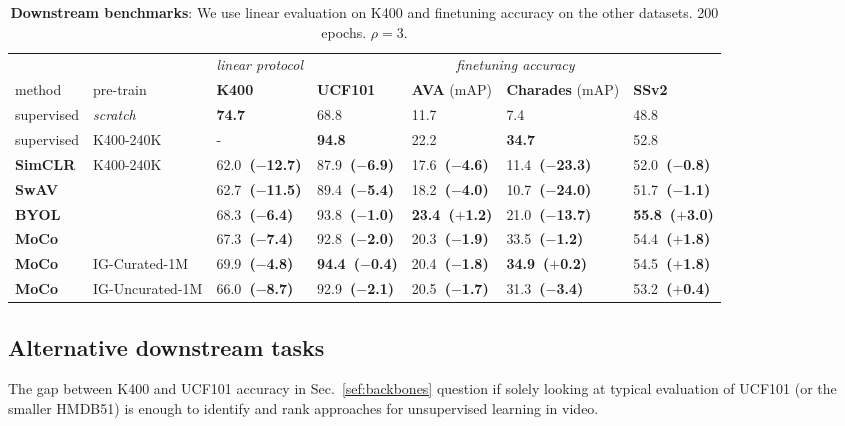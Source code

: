 \documentclass[final]{cvpr}
\newcommand{\sref}[1]{Sec.~\ref{#1}}
\newcommand{\tablestyle}[2]{\setlength{\tabcolsep}{#1}\renewcommand{\arraystretch}{#2}\centering\footnotesize}
\begin{document}
	\newcommand{\pacc}[1]{{\bf \fontsize{7.5}{42}\selectfont \color{citecolor!80}~(#1)}}
	\newcommand{\macc}[1]{{\bf \fontsize{7.5}{42}\selectfont \color{lightred!70}~(#1)}}
	\begin{table}[t] 
		\vspace{-18pt}
		\centering
		\tablestyle{8pt}{1.05} 
		\begin{tabular}{ll|l|llll}
			&&\textit{linear protocol}&\multicolumn{4}{c}{\textit{finetuning accuracy}} \\
			method & pre-train &\textbf{K400} & \textbf{UCF101} & \textbf{AVA} (mAP) & \textbf{Charades} (mAP) & \textbf{SSv2} \\
			\shline
			supervised & \textit{scratch} & \textbf{74.7} & 68.8 & 11.7  & 7.4  & 48.8 \\
			supervised &  K400-240K & - & \textbf{94.8} & 22.2  & \textbf{34.7}  & 52.8 \\ \hline
			\textbf{SimCLR}&  \multirow{4}{*}{K400-240K} & 62.0\macc{$-$12.7}  & 87.9\macc{$-$6.9}  & 17.6\macc{$-$4.6}  & 11.4\macc{$-$23.3}   &  52.0\macc{$-$0.8}       \\ 
			\textbf{SwAV} & & 62.7\macc{$-$11.5}  & 89.4\macc{$-$5.4}  & 18.2\macc{$-$4.0}  & 10.7\macc{$-$24.0}   &  51.7\macc{$-$1.1}       \\ 
			\textbf{BYOL}  && 68.3\macc{$-$6.4}  & 93.8\macc{$-$1.0}  & \textbf{23.4}\pacc{$+$1.2}  & 21.0\macc{$-$13.7}   &  \textbf{55.8}\pacc{$+$3.0}       \\ 
			\textbf{MoCo} & & 67.3\macc{$-$7.4}  & 92.8\macc{$-$2.0}  & 20.3\macc{$-$1.9}  & 33.5\macc{$-$1.2}   &  54.4\pacc{$+$1.8}       \\ \hline
			\textbf{MoCo} & IG-Curated-1M & 69.9\macc{$-$4.8} & \textbf{94.4}\macc{$-$0.4} &  20.4\macc{$-$1.8} &\textbf{34.9}\pacc{$+$0.2} & 54.5\pacc{$+$1.8} \\
			\textbf{MoCo} & IG-Uncurated-1M & 66.0\macc{$-$8.7} & 92.9\macc{$-$2.1} &  20.5\macc{$-$1.7} & 31.3\macc{$-$3.4} & 53.2\pacc{$+$0.4} 
		\end{tabular}
		\caption{\textbf{Downstream benchmarks}: We use linear evaluation on K400 and finetuning accuracy on the other datasets. 200 epochs.  $\rho{=}$3.}
		\label{tab:downstream}
	\end{table}
	\subsection{Alternative downstream tasks}
	The gap between K400 and UCF101 accuracy  in \sref{sef:backbones} question if solely looking at typical evaluation of UCF101 (or the smaller HMDB51) is enough to identify and rank approaches for unsupervised  learning in video. %
	
\end{document}
